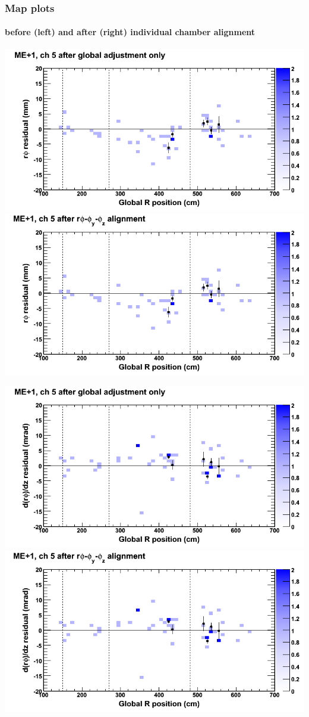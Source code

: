 \documentclass[compress]{beamer}
\begin{document}
\begin{frame}
\frametitle{Map plots}
\framesubtitle{before (left) and after (right) individual chamber alignment}
\includegraphics[width=0.5\linewidth]{ringmapplots_3dof/before_CSCvsr_mep1ch05_x.png} \includegraphics[width=0.5\linewidth]{ringmapplots_3dof/after_CSCvsr_mep1ch05_x.png}

\includegraphics[width=0.5\linewidth]{ringmapplots_3dof/before_CSCvsr_mep1ch05_dxdz.png} \includegraphics[width=0.5\linewidth]{ringmapplots_3dof/after_CSCvsr_mep1ch05_dxdz.png}
\end{frame}
\end{document}
